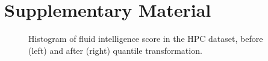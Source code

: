 \section{Supplementary Material}
\beginsupplement

\begin{figure}[H]
  \centering
  \caption{Histogram of fluid intelligence score in the HPC dataset, before (left) and after (right) quantile transformation.}
  \label{fig:hcp-hist}
\end{figure}

